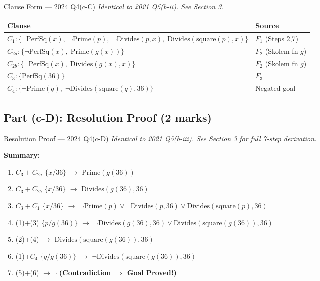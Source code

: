 \documentclass[12pt,a4paper]{article}
\newcommand{\cl}[1]{\{#1\}}      %
\begin{document}
\begin{solbox}{Clause Form --- 2024 Q4(c-C)}
\textit{Identical to 2021 Q5(b-ii). See Section 3.}

\medskip
\begin{tabular}{@{}l@{\quad}l@{}}
  \toprule
  \textbf{Clause} & \textbf{Source}\\
  \midrule
  $C_1: \cl{\neg\mathrm{PerfSq}(x),\;\neg\mathrm{Prime}(p),\;\neg\mathrm{Divides}(p,x),\;\mathrm{Divides}(\mathrm{square}(p),x)}$ & $F_1$ (Steps 2,7)\\[3pt]
  $C_{2a}: \cl{\neg\mathrm{PerfSq}(x),\;\mathrm{Prime}(g(x))}$ & $F_2$ (Skolem fn $g$)\\[3pt]
  $C_{2b}: \cl{\neg\mathrm{PerfSq}(x),\;\mathrm{Divides}(g(x),x)}$ & $F_2$ (Skolem fn $g$)\\[3pt]
  $C_3: \cl{\mathrm{PerfSq}(36)}$ & $F_3$ \\[3pt]
  $C_4: \cl{\neg\mathrm{Prime}(q),\;\neg\mathrm{Divides}(\mathrm{square}(q),36)}$ & Negated goal \\
  \bottomrule
\end{tabular}
\end{solbox}

\subsection{Part (c-D): Resolution Proof (2 marks)}

\begin{solbox}{Resolution Proof --- 2024 Q4(c-D)}
\textit{Identical to 2021 Q5(b-iii). See Section 3 for full 7-step derivation.}

\medskip
\textbf{Summary:}
\begin{enumerate}[noitemsep,label=\textbf{\arabic*.}]
  \item $C_3 + C_{2a}$ $\{x/36\}$ $\to$ $\mathrm{Prime}(g(36))$
  \item $C_3 + C_{2b}$ $\{x/36\}$ $\to$ $\mathrm{Divides}(g(36),36)$
  \item $C_3 + C_1$ $\{x/36\}$ $\to$ $\neg\mathrm{Prime}(p)\lor\neg\mathrm{Divides}(p,36)\lor\mathrm{Divides}(\mathrm{square}(p),36)$
  \item (1)+(3) $\{p/g(36)\}$ $\to$ $\neg\mathrm{Divides}(g(36),36)\lor\mathrm{Divides}(\mathrm{square}(g(36)),36)$
  \item (2)+(4) $\to$ $\mathrm{Divides}(\mathrm{square}(g(36)),36)$
  \item (1)+$C_4$ $\{q/g(36)\}$ $\to$ $\neg\mathrm{Divides}(\mathrm{square}(g(36)),36)$
  \item (5)+(6) $\to$ $\boxed{\square}$ \textbf{(Contradiction $\Rightarrow$ Goal Proved!)} \checkmark
\end{enumerate}
\end{solbox}
\end{document}
